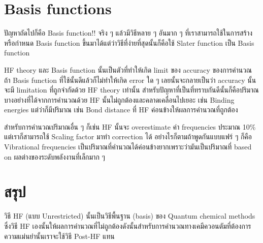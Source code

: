 \section{Basis functions} 

ปัญหาถัดไปก็คือ Basis function!! จริง ๆ แล้วมีวิธีหลาย ๆ อันมาก ๆ ที่เราสามารถใช้ในการสร้างหรือกำหนด 
Basis function ขึ้นมาได้แต่ว่าวิธีที่ง่ายที่สุดนั้นก็คือใช้ Slater function เป็น Basis function 

HF theory และ Basis function นั้นเป็นตัวที่ทำให้เกิด limit ของ accuracy ของการคำนวณ ถ้า Basis 
function ที่ใช้นั้นดีแล้วก็ไม่ทำให้เกิด error ใด ๆ เลยนั้นจะกลายเป็นว่า accuracy นั้นจะมี limitation 
ที่ถูกจำกัดด้วย HF theory เท่านั้น สำหรับปัญหาที่เป็นที่ทราบกันดีนั้นก็คือปริมาณบางอย่างที่ได้จากการคำนวณด้วย HF 
นั้นไม่ถูกต้องและคลาดเคลื่อนไปเยอะ เช่น Binding energies แต่ว่าก็มีปริมาณ เช่น Bond distance ที่ HF 
ค่อนข้างให้ผลการคำนวณที่ถูกต้อง

สำหรับการคำนวณปริมาณอื่น ๆ ก็เช่น HF นั้นจะ overestimate ค่า frequencies ประมาณ 10\% แต่เราก็สามารถใช้ 
Scaling factor มาทำ correction ได้ อย่างไรก็ตามถ้าพูดกันแบบแฟร์ ๆ ก็คือ Vibrational frequencies 
เป็นปริมาณที่คำนวณได้ค่อนข้างยากเพราะว่ามันเป็นปริมาณที่ based on ผลต่างของระดับพลังงานที่เล็กมาก ๆ 

\section{สรุป}

วิธี HF (แบบ Unrestricted) นั้นเป็นวิธีพื้นฐาน (basis) ของ Quantum chemical methods ซึ่งวิธี HF 
เองนั้นให้ผลการคำนวณที่ไม่ถูกต้องดังนั้นสำหรับการคำนวณทางเคมีควอนตัมที่ต้องการความแม่นยำนั้นเราจะใช้วิธี 
Post-HF แทน 
